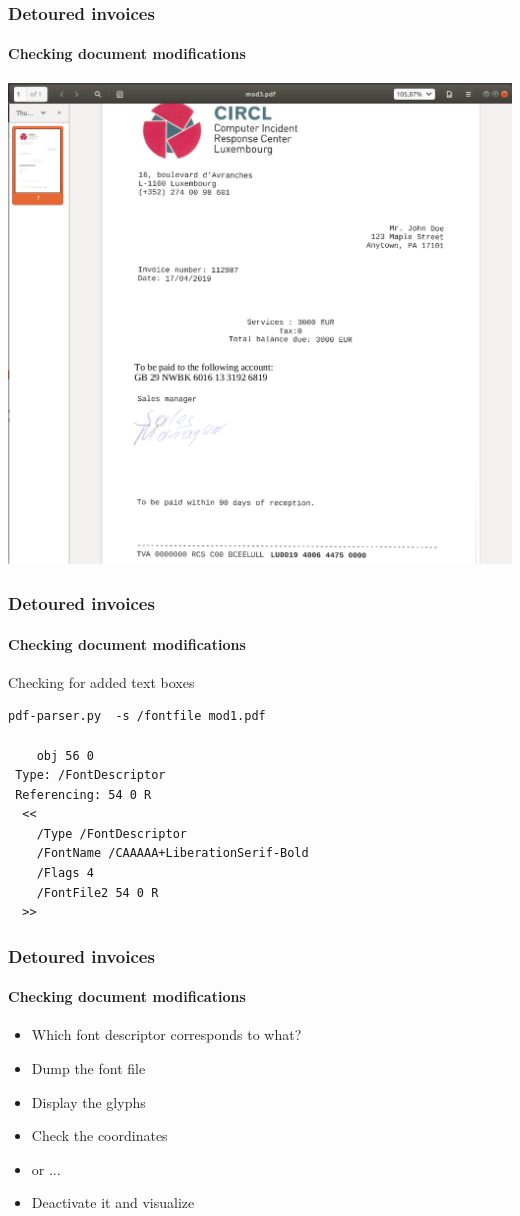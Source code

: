 \begin{frame}
    \frametitle{Detoured invoices}
    \framesubtitle{Checking document modifications}
    \begin{center}
        \includegraphics[scale=0.15]{add.png}
    \end{center}
\end{frame}

\begin{frame}[fragile]
    \frametitle{Detoured invoices}
    \framesubtitle{Checking document modifications}

    Checking for added text boxes
    \begin{lstlisting}
pdf-parser.py  -s /fontfile mod1.pdf

    obj 56 0
 Type: /FontDescriptor
 Referencing: 54 0 R
  <<
    /Type /FontDescriptor
    /FontName /CAAAAA+LiberationSerif-Bold
    /Flags 4
    /FontFile2 54 0 R
  >>
    \end{lstlisting}
\end{frame}


\begin{frame}[fragile]
    \frametitle{Detoured invoices}
    \framesubtitle{Checking document modifications}
    \begin{itemize}
        \item Which font descriptor corresponds to what?
        \item Dump the font file
        \item Display the glyphs
        \item Check the coordinates
        \item or ...
        \item Deactivate it and visualize
    \end{itemize}
\end{frame}

